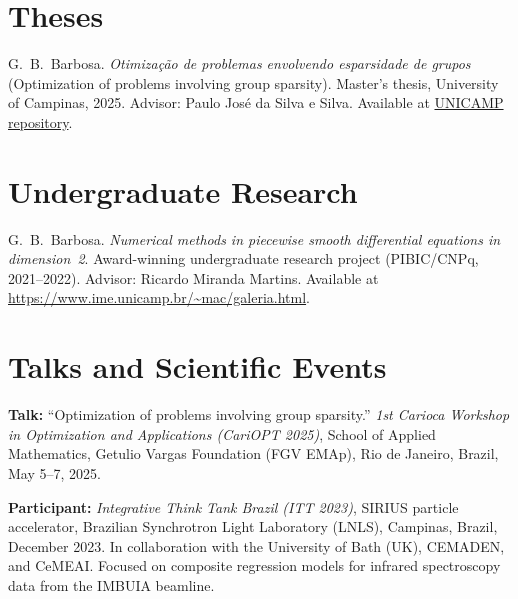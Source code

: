 \documentclass[11pt,a4paper]{article}
\begin{document}
\section{Theses}

\begin{enumerate}[leftmargin=1.5em, label={[\arabic*]}]
    \item G.\ B.\ Barbosa. \textit{Otimização de problemas envolvendo esparsidade de grupos} (Optimization of problems involving group sparsity). Master's thesis, University of Campinas, 2025. Advisor: Paulo José da Silva e Silva. Available at \href{https://www.ime.unicamp.br/pos-graduacao/matematica-aplicada/minimizacao-problemas-compositos-com-regularizacoes-descontinuas}{UNICAMP repository}.
\end{enumerate}

\section{Undergraduate Research}

\begin{enumerate}[leftmargin=1.5em, label={[\arabic*]}]
    \item G.\ B.\ Barbosa. \textit{Numerical methods in piecewise smooth differential equations in dimension~2}. Award-winning undergraduate research project (PIBIC/CNPq, 2021--2022). Advisor: Ricardo Miranda Martins. Available at \url{https://www.ime.unicamp.br/~mac/galeria.html}.
\end{enumerate}

\section{Talks and Scientific Events}

\begin{enumerate}[leftmargin=1.5em, label={[\arabic*]}]
    \item \textbf{Talk:} ``Optimization of problems involving group sparsity.'' \textit{1st Carioca Workshop in Optimization and Applications (CariOPT 2025)}, School of Applied Mathematics, Getulio Vargas Foundation (FGV EMAp), Rio de Janeiro, Brazil, May 5--7, 2025.

    \item \textbf{Participant:} \textit{Integrative Think Tank Brazil (ITT 2023)}, SIRIUS particle accelerator, Brazilian Synchrotron Light Laboratory (LNLS), Campinas, Brazil, December 2023. In collaboration with the University of Bath (UK), CEMADEN, and CeMEAI. Focused on composite regression models for infrared spectroscopy data from the IMBUIA beamline.
\end{enumerate}
\end{document}
